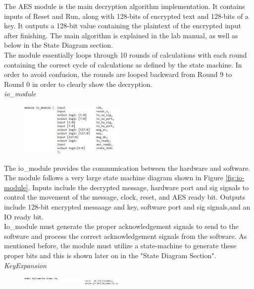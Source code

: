 \documentclass[journal, twocolumn, final,11pt,letterpaper]{IEEEtran}
\begin{document}
The AES module is the main decryption algorithm implementation. It contains inputs of Reset and Run, along with 128-bits of encrypted text and 128-bits of a key. It outputs a 128-bit value containing the plaintext of the encrypted input after finishing. The main algorithm is explained in the lab manual, as well as below in the State Diagram section. \\

The module essentially loops through 10 rounds of calculations with each round containing the correct cycle of calculations as defined by the state machine. In order to avoid confusion, the rounds are looped backward from Round 9 to Round 0 in order to clearly show the decryption. \\

\textit{io\_module}\\
\vspace{-4mm}

\begin{figure}[h]
	\centering
	\includegraphics[width=0.45\textwidth]{iomodule.jpg}
	\label{fig:iomodule}
\end{figure}

The io\_module provides the communication between the hardware and software.  The module follows a very large state machine diagram shown in Figure \ref{fig:io-module}. Inputs include the decrypted message, hardware port and sig signals to control the movement of the message, clock, reset, and AES ready bit.  Outputs include 128-bit encrypted messaage and key, software port and sig signals,and an IO ready bit. \\

Io\_module must generate the proper acknowledgement signals to send to the software and process the correct acknowledgement signals from the software. As mentioned before, the module must utilize a state-machine to generate these proper bits and this is shown later on in the "State Diagram Section". \\

\textit{KeyExpansion}\\
\vspace{-4mm}

\begin{figure}[h]
	\centering
	\includegraphics[width=0.45\textwidth]{KeyExpansion.jpg}
	\label{fig:KeyExpansion}
\end{figure}
\end{document}
